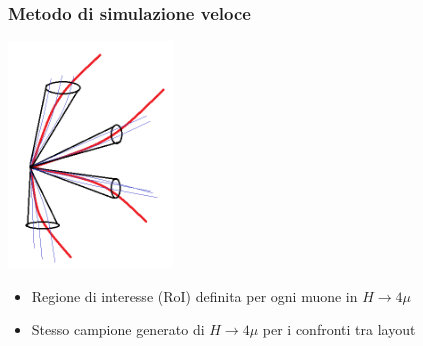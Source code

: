 \documentclass{beamer}
\begin{document}
\begin{frame}[t]
\frametitle{Metodo di simulazione veloce}
\centering
\includegraphics[width=.5\textwidth, height=6cm]{HiggsCones}

\begin{itemize}
\item Regione di interesse (RoI) definita per ogni muone in $H \rightarrow 4\mu$
\item Stesso campione generato di $H \rightarrow 4\mu$ per i confronti tra layout
\end{itemize}

\end{frame}
\end{document}
